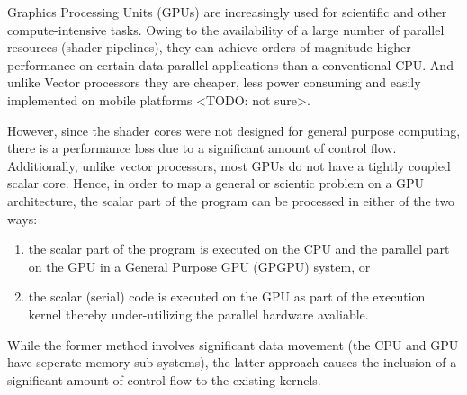 
\par{Graphics Processing Units (GPUs) are increasingly used for scientific and other compute-intensive tasks. Owing to the availability of a large number of parallel resources (shader pipelines), they can achieve orders of magnitude higher performance on certain data-parallel applications than a conventional CPU. And unlike Vector processors they are cheaper, less power consuming and easily implemented on mobile platforms <TODO: not sure>.
}

\par{
However, since the shader cores were not designed for general purpose computing, there is a performance loss due to a significant amount of control flow. Additionally, unlike vector processors, most GPUs do not have a tightly coupled scalar core. Hence, in order to map a general or scientic problem on a GPU architecture, the scalar part of the program can be processed in either of the two ways:}

\begin{enumerate}
	\item the scalar part of the program is executed on the CPU and the parallel part on the GPU in a General Purpose GPU (GPGPU) system, or 
	\item the scalar (serial) code is executed on the GPU as part of the execution kernel thereby under-utilizing the parallel hardware avaliable.
\end{enumerate} 

\par{
While the former method involves significant data movement (the CPU and GPU have seperate memory sub-systems), the latter approach causes the inclusion of a significant amount of control flow to the existing kernels.}

